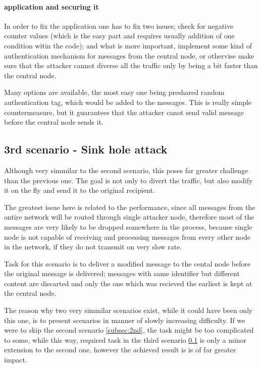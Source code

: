 \documentclass[
  digital, %
  table,   %
  nolof,     %
  nolot,     %
           oneside
]{fithesis3}
\begin{document}
    \paragraph{application and securing it}
    In order to fix the application one has to fix two issues; check for negative counter values (which is the easy part and requires usually addition of one condition witin the code); and what is more important, implement some kind of authentication mechanism for messages from the central node, or othervise make sure that the attacker cannot diverse all the traffic only by being a bit faster than the central node.

    Many options are available, the most easy one being preshared random authentication tag, which would be added to the messages. This is really simple countermeasure, but it guarantees that the attacker canot send valid message before the central node sends it.

    \subsection{3rd scenario - Sink hole attack}\label{subsec:3rd}
    Although very simmilar to the second scenario, this poses far greater   challenge than the previous one. The goal is not only to divert the traffic, but also modify it on the fly and send it to the original recipient.

    The greatest issue here is related to the performance, since all messages from the ontire network will be routed through single attacker node, therefore most of the messages are very likely to be dropped somewhere in the process, because single node is not capable of receiving and processing messages from every other node in the network, if they do not transmit on very slow rate.

    Task for this scenario is to deliver a modified message to the cental node before the original message is delivered; messages with same identifier but different content are discarted and only the one which was recieved the earliest is kept at the central node.

    The reason why two very simmilar scenarios exist, while it could have been only this one, is to present scenarios in manner of slowly increasing difficulty. If we were to skip the second scenario \ref{subsec:2nd}, the task might be too complicated to some, while this way, required task in the third scenario \ref{subsec:3rd} is only a minor extension to the second one, however the achieved result is is of far greater impact.
\end{document}

